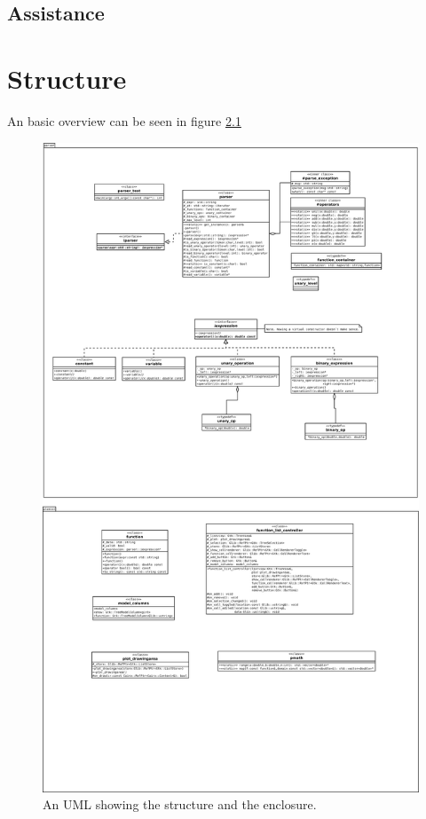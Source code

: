 \documentclass[a4paper,11pt]{kth-mag}
\begin{document}
\section{Assistance}


\chapter{Structure}
An basic overview can be seen in figure \ref{fig:UML}
\begin{figure}[ht]
\begin{center}
    \includegraphics[width=\textwidth]{uml.pdf}
    \caption{\small{An UML showing the structure and the enclosure.}}\label{fig:UML}
\end{center}
\end{figure}
\end{document}
